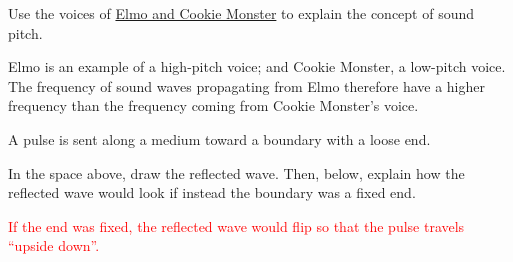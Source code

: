 \documentclass[answers]{exam}
\begin{document}
\begin{questions}
\question
Use the voices of \href{https://youtu.be/DgG6tXHru8c?si=Jcyk5kerVd4VnxNU}{Elmo and Cookie Monster} to explain the concept of sound pitch.

\ifprintanswers
{\color{red}
Elmo is an example of a high-pitch voice; and Cookie Monster, a low-pitch voice. The frequency of sound waves propagating from Elmo therefore have a higher frequency than the frequency coming from Cookie Monster's voice.
}
\fi

\fillwithlines{14mm}

\question
A pulse is sent along a medium toward a boundary with a loose end.

\begin{center}
\hspace{2cm}
\end{center}

In the space above, draw the reflected wave. Then, below, explain how the reflected wave would look if instead the boundary was a fixed end.

\ifprintanswers
\textcolor{red}{If the end was fixed, the reflected wave would flip so that the pulse travels ``upside down''.}
\else
\fillwithlines{14mm}
\fi










\end{questions}
\end{document}
